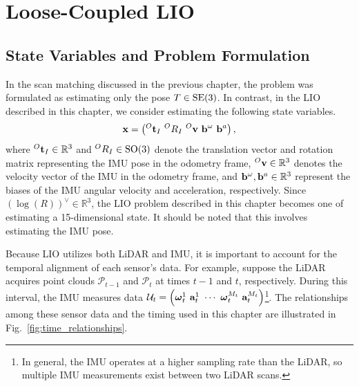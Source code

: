 \chapter{Loose-Coupled LIO}
\label{sec:loose_coupling_lio}

\section{State Variables and Problem Formulation}
\label{eq:state_and_problem_setting_loose_coupling}

In the scan matching discussed in the previous chapter, the problem was formulated as estimating only the pose $T \in {\rm SE}(3)$.
In contrast, in the LIO described in this chapter, we consider estimating the following state variables.
%
\begin{align}
  {\bf x} = \left( {}^{O}{\bf t}_{I} ~ {}^{O}R_{I} ~ {}^{O}{\bf v} ~ {\bf b}^{\omega} ~ {\bf b}^{a} \right),
  \label{eq:loose_coupling_lio_state}
\end{align}
%
where ${}^{O}{\bf t}_{I} \in \mathbb{R}^{3}$ and ${}^{O}R_{I} \in {\rm SO}(3)$ denote the translation vector and rotation matrix representing the IMU pose in the odometry frame, ${}^{O}{\bf v} \in \mathbb{R}^{3}$ denotes the velocity vector of the IMU in the odometry frame, and ${\bf b}^{\omega}, {\bf b}^{a} \in \mathbb{R}^{3}$ represent the biases of the IMU angular velocity and acceleration, respectively.
Since $\left( \log \left( R \right) \right)^{\vee} \in \mathbb{R}^{3}$, the LIO problem described in this chapter becomes one of estimating a 15-dimensional state.
It should be noted that this involves estimating the IMU pose.

Because LIO utilizes both LiDAR and IMU, it is important to account for the temporal alignment of each sensor's data.
For example, suppose the LiDAR acquires point clouds $\mathcal{P}_{t-1}$ and $\mathcal{P}_{t}$ at times $t-1$ and $t$, respectively.
During this interval, the IMU measures data $\mathcal{U}_{t} = \left( \boldsymbol{\omega}_{t}^{1} ~ {\bf a}_{t}^{1} ~ \cdots ~ \boldsymbol{\omega}_{t}^{M_{t}} ~ {\bf a}_{t}^{M_{t}} \right)$\footnote{In general, the IMU operates at a higher sampling rate than the LiDAR, so multiple IMU measurements exist between two LiDAR scans.}.
The relationships among these sensor data and the timing used in this chapter are illustrated in Fig.~\ref{fig:time_relationships}.

